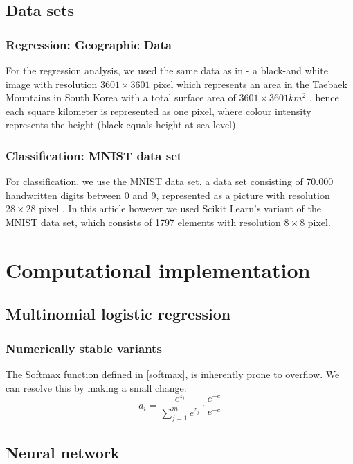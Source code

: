 \documentclass[11pt,a4paper,titlepage]{article}
\begin{document}
\subsection{Data sets}
\subsubsection{Regression: Geographic Data}
For the regression analysis, we used the same data as in \citep{Project1} - a black-and white image with resolution $3601 \times 3601$ pixel which represents an area in the Taebaek Mountains in South Korea with a total surface area of $3601 \times 3601km^2$ , hence each square kilometer is represented as one pixel, where colour intensity represents the height (black equals height at sea level).
\subsubsection{Classification: MNIST data set}
For classification, we use the MNIST data set, a data set consisting of 70.000 handwritten digits between 0 and 9, represented as a picture with resolution $28\times28$ pixel \citep{lecun2010mnist}. In this article however we used Scikit Learn's variant of the MNIST data set, which consists of 1797 elements with resolution $8\times8$ pixel. 
\section{Computational implementation}

\subsection{Multinomial logistic regression}


\subsubsection{Numerically stable variants}
The Softmax function defined in \eqref{softmax}, is inherently prone to overflow. We can resolve this by making a small change:
\begin{equation}
a_i= \frac{e^{z_i}}{\sum_{j=1}^{m} e^{z_j}} \cdot \frac{e^{-c}}{e^{-c}}
\end{equation}


\subsection{Neural network}
\end{document}
